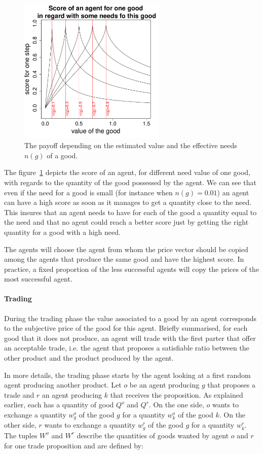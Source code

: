 \documentclass{wscpaperproc}
\begin{document}
\begin{figure}[htp]
	\begin{center}
		\includegraphics[width=7cm]{img/fitness.pdf}
	\end{center}
	\caption{The payoff depending on the estimated value and the effective needs $n(g)$ of a good.}
	\label{fig:fit}
\end{figure}
The figure~\ref{fig:fit} depicts the score of an agent, for different need value of one good, with regards to the quantity of the good possessed by the agent. We can see that even if the need for a good is small (for instance when $n(g) = 0.01$) an agent can have a high score as soon as it manages to get a quantity close to the need. This insures that an agent needs to have for each of the good a quantity equal to the need and that no agent could reach a better score just by getting the right quantity for a good with a high need.

The agents will choose the agent from whom the price vector should be copied among the agents that produce the same good and have the highest score. In practice, a fixed proportion of the less successful agents will copy the prices of the most successful agent. 


\paragraph{Trading} 
During the trading phase the value associated to a good by an agent corresponds to the subjective price of the good for this agent. Briefly summarised, for each good that it does not produce, an agent will trade with the first parter that offer an acceptable trade, i.e. the agent that proposes a satisfiable ratio between the other product and the product produced by the agent. 

In more details, the trading phase starts by the agent looking at a first random agent producing another product. 
Let $o$ be an agent producing $g$ that proposes a trade and $r$ an agent producing $k$ that receives the proposition. As explained earlier, each has a quantity of good $Q^o$ and $Q^r$. On the one side, $o$ wants to exchange a quantity $w_g^o$ of the good $g$ for a quantity $w_k^o$ of the good $k$. On the other side, $r$ wants to exchange a quantity $w_g^r$ of the good $g$ for a quantity $w_k^r$. The tuples $W^o$ and $W^r$ describe the quantities of goods wanted by agent $o$ and $r$ for one trade proposition and are defined by:  
\end{document}
